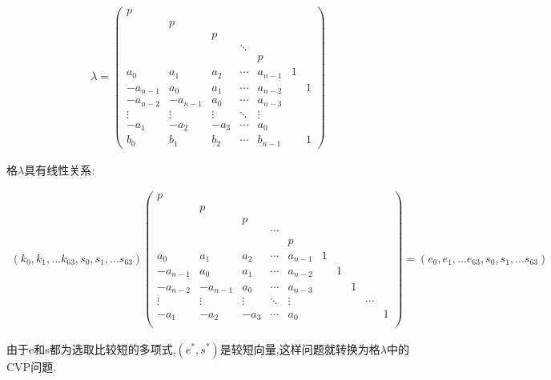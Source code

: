 \documentclass[12pt,a4paper]{article}
\numberwithin{equation}{section}
\begin{document}
\begin{align}
	\lambda=
	\left(
	\begin{smallmatrix}
		p        &          &        &        &         &   &   \\
		& p        &        &        &         &   &   \\
		&          & p      &        &         &   &   \\
		&          &        & \ddots &         &   &   \\
		&          &        &        & p       &   &   \\
		a_0      & a_1      & a_2    & \cdots & a_{n-1} & 1 &   \\
		-a_{n-1} & a_0      & a_1    & \cdots & a_{n-2} &   & 1 \\
		-a_{n-2} & -a_{n-1} & a_0    & \cdots & a_{n-3} &   &   \\
		\vdots   & \vdots   & \vdots & \ddots & \vdots  &   &   \\
		-a_1     & -a_2     & -a_3   & \cdots & a_0     &   &   \\
		b_0      & b_1      & b_2    & \cdots & b_{n-1} &   & 1
	\end{smallmatrix}
	\right)
\end{align}

格$\lambda$具有线性关系:

\begin{align}
	(k_0,k_1,...k_{63},s_0,s_1,...s_{63})
	\left(
	\begin{smallmatrix}
			p\\
			&p\\
			&&p\\
			&&&\cdots\\
			&&&&p\\
			a_0    &a_1    &a_2   &\cdots &a_{n-1}            &1\\
			-a_{n-1}&a_0    &a_1   &\cdots &a_{n-2}       &&1\\
			-a_{n-2}&-a_{n-1}&a_0   &\cdots &a_{n-3}  &&&1\\
			\vdots &\vdots &\vdots&\ddots &\vdots             &&&&\cdots\\
			-a_1    &-a_2    &-a_3   &\cdots &a_0 &&&&&1\\
		\end{smallmatrix}
	\right)
	=
	(e_0,e_1,...e_{63},s_0,s_1,...s_{63})
\end{align}

由于e和s都为选取比较短的多项式,$(e^*,s^*)$是较短向量,这样问题就转换为格$\lambda$中的CVP问题.
\end{document}
